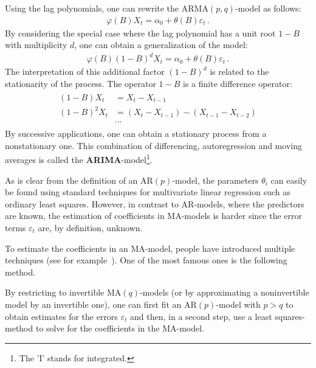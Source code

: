     Using the lag polynomials, one can rewrite the $\mathrm{ARMA}(p,q)$-model as follows:
    \begin{gather}
        \varphi(B)X_t = \alpha_0 + \theta(B)\varepsilon_t\,.
    \end{gather}
    By considering the special case where the lag polynomial has a unit root $1-B$ with multiplicity $d$, one can obtain a generalization of the model:
    \begin{gather}
        \varphi(B)(1-B)^dX_t = \alpha_0 + \theta(B)\varepsilon_t\,.
    \end{gather}
    The interpretation of this additional factor $(1-B)^d$ is related to the stationarity of the process. The operator $1-B$ is a finite difference operator:
    \begin{gather}
        \begin{aligned}
            (1-B)X_t &= X_t - X_{t-1}\\
            (1-B)^2X_t &= (X_t-X_{t-1}) - (X_{t-1}-X_{t-2})\\
            &\cdots
        \end{aligned}
    \end{gather}
    By successive applications, one can obtain a stationary process from a nonstationary one. This combination of differencing, autoregression and moving averages is called the \textbf{ARIMA}-model\footnote{The 'I' stands for integrated.}.


    \begin{remark}
        As is clear from the definition of an $\mathrm{AR}(p)$-model, the parameters $\theta_i$ can easily be found using standard techniques for multivariate linear regression such as ordinary least squares. However, in contrast to AR-models, where the predictors are known, the estimation of coefficients in MA-models is harder since the error terms $\varepsilon_t$ are, by definition, unknown.
    \end{remark}

    To estimate the coefficients in an MA-model, people have introduced multiple techniques (see for example~\citet{sandgren_moving_2006}). One of the most famous ones is the following method.
    \begin{method}[Durbin]
        By restricting to invertible $\mathrm{MA}(q)$-models (or by approximating a noninvertible model by an invertible one), one can first fit an $\mathrm{AR}(p)$-model with $p>q$ to obtain estimates for the errors $\varepsilon_t$ and then, in a second step, use a least squares-method to solve for the coefficients in the MA-model.
    \end{method}

